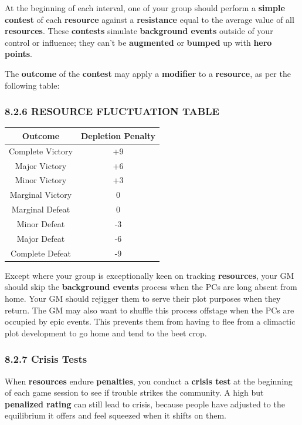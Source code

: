 \documentclass[
]{article}
\begin{document}
At the beginning of each interval, one of your group should perform a
\textbf{simple contest} of each \textbf{resource} against a
\textbf{resistance} equal to the average value of all
\textbf{resources}. These \textbf{contests} simulate \textbf{background
events} outside of your control or influence; they can't be
\textbf{augmented} or \textbf{bumped} up with \textbf{hero points}.

The \textbf{outcome} of the \textbf{contest} may apply a
\textbf{modifier} to a \textbf{resource}, as per the following table:

\hypertarget{resource-fluctuation-table}{%
\subsubsection{8.2.6 RESOURCE FLUCTUATION
TABLE}\label{resource-fluctuation-table}}

\begin{longtable}[]{@{}cc@{}}
\toprule
Outcome & Depletion Penalty\tabularnewline
\midrule
\endhead
Complete Victory & +9\tabularnewline
Major Victory & +6\tabularnewline
Minor Victory & +3\tabularnewline
Marginal Victory & 0\tabularnewline
Marginal Defeat & 0\tabularnewline
Minor Defeat & -3\tabularnewline
Major Defeat & -6\tabularnewline
Complete Defeat & -9\tabularnewline
\bottomrule
\end{longtable}

Except where your group is exceptionally keen on tracking
\textbf{resources}, your GM should skip the \textbf{background events}
process when the PCs are long absent from home. Your GM should rejigger
them to serve their plot purposes when they return. The GM may also want
to shuffle this process offstage when the PCs are occupied by epic
events. This prevents them from having to flee from a climactic plot
development to go home and tend to the beet crop.

\hypertarget{crisis-tests}{%
\subsubsection{8.2.7 Crisis Tests}\label{crisis-tests}}

When \textbf{resources} endure \textbf{penalties}, you conduct a
\textbf{crisis test} at the beginning of each game session to see if
trouble strikes the community. A high but \textbf{penalized rating} can
still lead to crisis, because people have adjusted to the equilibrium it
offers and feel squeezed when it shifts on them.
\end{document}
